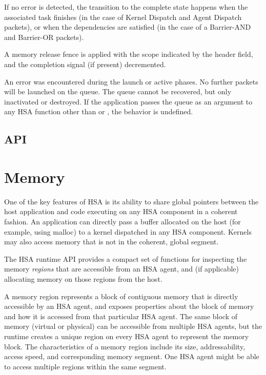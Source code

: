 \documentclass[final,oneside]{book}
\begin{document}
\begin{description}[itemsep=2pt,leftmargin=0cm, labelindent=0cm]
  If no error is detected, the transition to the complete state happens when the
  associated task finishes (in the case of Kernel Dispatch and Agent Dispatch
  packets), or when the dependencies are satisfied (in the case of a Barrier-AND
  and Barrier-OR packets).

\item[Complete] A memory release fence is applied with the scope indicated by
  the  header field, and the
  completion signal (if present) decremented.

\item[Error] An error was encountered during the launch or active phases. No
  further packets will be launched on the queue. The queue cannot be recovered,
  but only inactivated or destroyed. If the application passes the queue as an
  argument to any HSA function other than  or
  , the behavior is undefined.

\end{description}

\subsection{API}


\section{Memory}\label{sec:memory}

One of the key features of HSA is its ability to share global pointers between
the host application and code executing on any HSA component in a coherent
fashion. An application can directly pass a buffer allocated on the host (for
example, using malloc) to a kernel dispatched in any HSA component. Kernels may
also access memory that is not in the coherent, global segment.

The HSA runtime API provides a compact set of functions for inspecting the
memory \emph{regions} that are accessible from an HSA agent, and (if applicable)
allocating memory on those regions from the host.

A memory region represents a block of contiguous memory that is directly
accessible by an HSA agent, and exposes properties about the block of memory and
how it is accessed from that particular HSA agent. The same block of memory
(virtual or physical) can be accessible from multiple HSA agents, but the
runtime creates a unique region on every HSA agent to represent the memory
block. The characteristics of a memory region include its size, addressability,
access speed, and corresponding memory segment. One HSA agent might be able to
access multiple regions within the same segment.
\end{document}
